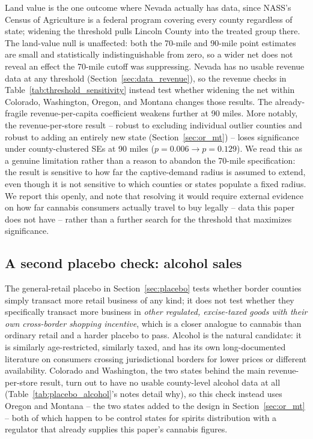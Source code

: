 ﻿\documentclass{article}
\begin{document}


Land value is the one outcome where Nevada actually has data, since NASS's Census of Agriculture is a
federal program covering every county regardless of state; widening the threshold pulls Lincoln County
into the treated group there. The land-value null is unaffected: both the 70-mile and 90-mile point
estimates are small and statistically indistinguishable from zero, so a wider net does not reveal an
effect the 70-mile cutoff was suppressing. Nevada has no usable revenue data at any threshold
(Section~\ref{sec:data_revenue}), so the revenue checks in Table~\ref{tab:threshold_sensitivity} instead
test whether widening the net within Colorado, Washington, Oregon, and Montana changes those results. The
already-fragile revenue-per-capita coefficient weakens further at 90 miles. More notably, the
revenue-per-store result -- robust to excluding individual outlier counties and robust to adding an
entirely new state (Section~\ref{sec:or_mt}) -- loses significance under county-clustered SEs at 90 miles
($p=0.006\to p=0.129$). We read this as a genuine limitation rather than a reason to abandon the 70-mile
specification: the result is sensitive to how far the captive-demand radius is assumed to extend, even
though it is not sensitive to which counties or states populate a fixed radius. We report this openly, and
note that resolving it would require external evidence on how far cannabis consumers actually travel to
buy legally -- data this paper does not have -- rather than a further search for the threshold that
maximizes significance.

\subsection{A second placebo check: alcohol sales}
\label{sec:placebo_alcohol}

The general-retail placebo in Section~\ref{sec:placebo} tests whether border counties simply transact more
retail business of any kind; it does not test whether they specifically transact more business in
\emph{other regulated, excise-taxed goods with their own cross-border shopping incentive}, which is a
closer analogue to cannabis than ordinary retail and a harder placebo to pass. Alcohol is the natural
candidate: it is similarly age-restricted, similarly taxed, and has its own long-documented literature on
consumers crossing jurisdictional borders for lower prices or different availability. Colorado and
Washington, the two states behind the main revenue-per-store result, turn out to have no usable
county-level alcohol data at all (Table~\ref{tab:placebo_alcohol}'s notes detail why), so this check instead
uses Oregon and Montana -- the two states added to the design in Section~\ref{sec:or_mt} -- both of which
happen to be control states for spirits distribution with a regulator that already supplies this paper's
cannabis figures.
\end{document}
